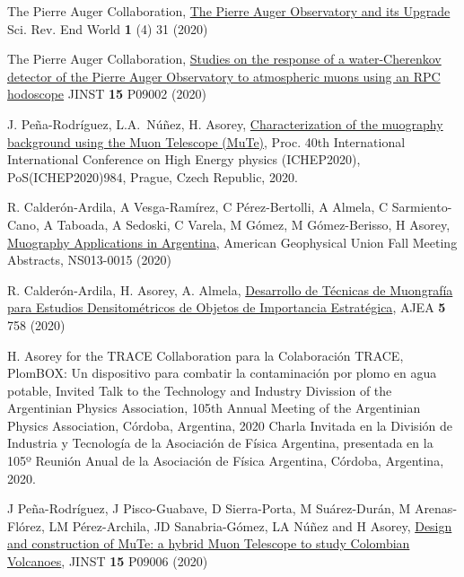 \begin{etaremune}
\item {}The Pierre Auger Collaboration, \href{https://doi.org/10.52712/sciencereviews.v1i4.31}{The Pierre Auger Observatory and its Upgrade} Sci.
Rev. End World {\textbf{1}} (4) 31 (2020)

\item {}The Pierre Auger Collaboration, \href{https://doi.org/10.1088/1748-0221/15/09/P09002}{Studies on the response of a water-Cherenkov detector of the Pierre Auger Observatory to atmospheric muons using an RPC hodoscope} JINST {\textbf{15}} P09002 (2020) %

\item {} J. Peña-Rodríguez, L.A.\ Núñez, H. Asorey, \href{https://doi.org/10.22323/1.390.0984}{Characterization of the muography background using the Muon Telescope (MuTe)}, \en Proc.
40th International International Conference on High Energy physics (ICHEP2020), PoS(ICHEP2020)984, Prague,  Czech Republic, 2020. %

\item {} R. Calderón-Ardila, A Vesga-Ramírez, C Pérez-Bertolli, A Almela, C Sarmiento-Cano, A Taboada, A Sedoski, C Varela, M Gómez, M Gómez-Berisso, H Asorey, \href{https://ui.adsabs.harvard.edu/abs/2020AGUFMNS0130015C/abstract}{Muography Applications in Argentina}, American Geophysical Union Fall Meeting Abstracts, NS013-0015 (2020)

\item {} R. Calderón-Ardila, H. Asorey, A. Almela, \href{https://doi.org/10.33414/ajea.5.758.2020}{Desarrollo de Técnicas de Muongrafía para Estudios Densitométricos de Objetos de Importancia Estratégica}, AJEA {\textbf{5}} 758 (2020)

\item {} H. Asorey \ifeng for the TRACE Collaboration \else para la Colaboración TRACE\fi, PlomBOX: Un dispositivo para combatir la contaminación por plomo en agua potable, \ifeng Invited Talk to the Technology and Industry Divission of the Argentinian Physics Association, 105th Annual Meeting of the Argentinian Physics Association, Córdoba, Argentina, 2020 \else Charla Invitada en la División de Industria y Tecnología de la Asociación de Física Argentina, presentada en la 105º Reunión Anual de la Asociación de Física Argentina, Córdoba, Argentina, 2020.\fi

\item {} J Peña-Rodríguez, J Pisco-Guabave, D Sierra-Porta, M Suárez-Durán, M Arenas-Flórez, LM Pérez-Archila, JD Sanabria-Gómez, LA Núñez and H Asorey, \href{https://doi.org/10.1088/1748-0221/15/09/P09006}{{Design and construction of MuTe: a hybrid Muon Telescope to study Colombian Volcanoes}}, JINST {\textbf{15}} P09006 (2020)%


\end{etaremune}
